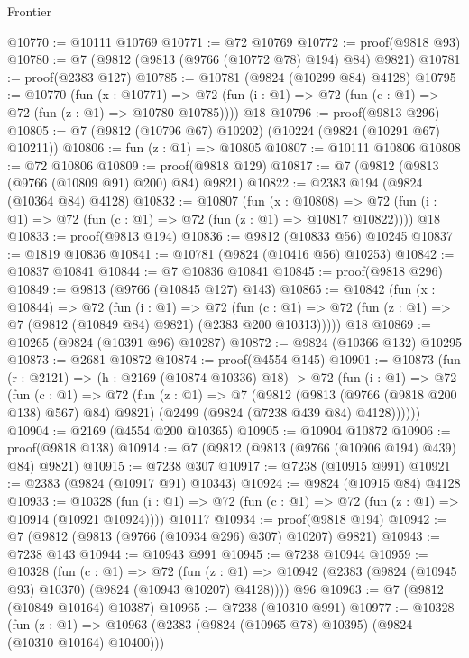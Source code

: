 \begin{lexlean}{Frontier}
\begin{coremodule}
@10770 := @10111 @10769
@10771 := @72 @10769
@10772 := proof(@9818 @93)
@10780 := @7 (@9812 (@9813 (@9766 (@10772 @78) @194) @84) @9821)
@10781 := proof(@2383 @127)
@10785 := @10781 (@9824 (@10299 @84) @4128)
@10795 := @10770
    (fun (x : @10771) =>
    @72 (fun (i : @1) => @72 (fun (c : @1) => @72 (fun (z : @1) => @10780 @10785))))
    @18
@10796 := proof(@9813 @296)
@10805 := @7 (@9812 (@10796 @67) @10202) (@10224 (@9824 (@10291 @67) @10211))
@10806 := fun (z : @1) => @10805
@10807 := @10111 @10806
@10808 := @72 @10806
@10809 := proof(@9818 @129)
@10817 := @7 (@9812 (@9813 (@9766 (@10809 @91) @200) @84) @9821)
@10822 := @2383 @194 (@9824 (@10364 @84) @4128)
@10832 := @10807
    (fun (x : @10808) =>
    @72 (fun (i : @1) => @72 (fun (c : @1) => @72 (fun (z : @1) => @10817 @10822))))
    @18
@10833 := proof(@9813 @194)
@10836 := @9812 (@10833 @56) @10245
@10837 := @1819 @10836
@10841 := @10781 (@9824 (@10416 @56) @10253)
@10842 := @10837 @10841
@10844 := @7 @10836 @10841
@10845 := proof(@9818 @296)
@10849 := @9813 (@9766 (@10845 @127) @143)
@10865 := @10842
    (fun (x : @10844) =>
    @72
      (fun (i : @1) =>
      @72
        (fun (c : @1) => @72 (fun (z : @1) => @7 (@9812 (@10849 @84) @9821) (@2383 @200 @10313)))))
    @18
@10869 := @10265 (@9824 (@10391 @96) @10287)
@10872 := @9824 (@10366 @132) @10295
@10873 := @2681 @10872
@10874 := proof(@4554 @145)
@10901 := @10873
    (fun (r : @2121) =>
    (h : @2169 (@10874 @10336) @18) ->
    @72
      (fun (i : @1) =>
      @72
        (fun (c : @1) =>
        @72
          (fun (z : @1) =>
          @7
            (@9812 (@9813 (@9766 (@9818 @200 @138) @567) @84) @9821)
            (@2499 (@9824 (@7238 @439 @84) @4128))))))
@10904 := @2169 (@4554 @200 @10365)
@10905 := @10904 @10872
@10906 := proof(@9818 @138)
@10914 := @7 (@9812 (@9813 (@9766 (@10906 @194) @439) @84) @9821)
@10915 := @7238 @307
@10917 := @7238 (@10915 @991)
@10921 := @2383 (@9824 (@10917 @91) @10343)
@10924 := @9824 (@10915 @84) @4128
@10933 := @10328
    (fun (i : @1) => @72 (fun (c : @1) => @72 (fun (z : @1) => @10914 (@10921 @10924))))
    @10117
@10934 := proof(@9818 @194)
@10942 := @7 (@9812 (@9813 (@9766 (@10934 @296) @307) @10207) @9821)
@10943 := @7238 @143
@10944 := @10943 @991
@10945 := @7238 @10944
@10959 := @10328
    (fun (c : @1) =>
    @72 (fun (z : @1) => @10942 (@2383 (@9824 (@10945 @93) @10370) (@9824 (@10943 @10207) @4128))))
    @96
@10963 := @7 (@9812 (@10849 @10164) @10387)
@10965 := @7238 (@10310 @991)
@10977 := @10328
    (fun (z : @1) => @10963 (@2383 (@9824 (@10965 @78) @10395) (@9824 (@10310 @10164) @10400)))

\end{coremodule}
\end{lexlean}
